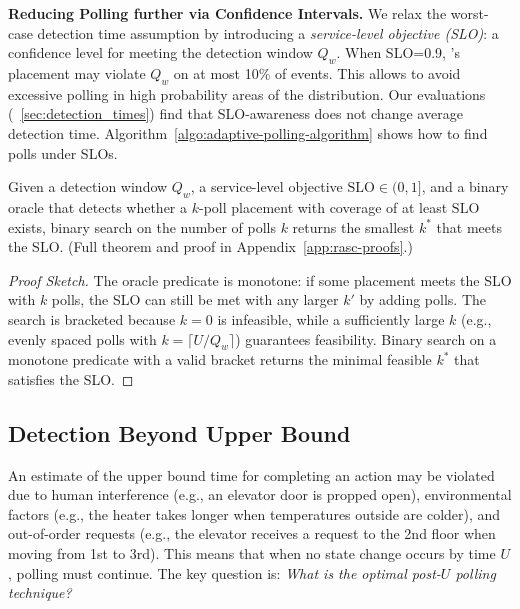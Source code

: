 {{\noindent \textbf{Reducing Polling further via  Confidence Intervals.} 
We relax the worst-case detection time assumption by introducing a {\it service-level objective (SLO)}: a confidence level for meeting the detection window $Q_w$. 
When SLO=0.9, \sysname’s placement may violate $Q_w$ on at most 10\% of events.
This allows \sysname{} to avoid excessive polling in high probability areas of the distribution.
Our evaluations (\Section~\ref{sec:detection_times}) find that  SLO-awareness does not change average detection time. Algorithm~\ref{algo:adaptive-polling-algorithm} shows how to find polls under SLOs.

\begin{theorem}
Given a detection window $Q_w$, a service-level objective $\text{SLO}\in(0,1]$, and a binary oracle that detects whether a $k$-poll placement with coverage of at least $\text{SLO}$ exists, binary search on the number of polls $k$ returns the smallest $k^*$ that meets the SLO. (\noindent Full theorem and proof in Appendix~\ref{app:rasc-proofs}.)
\end{theorem}
\vspace{-0.3cm}

\begin{proof}[Proof Sketch]
The oracle predicate is monotone: if some placement meets the SLO with $k$ polls, the SLO can still be met with any larger $k'$ by adding polls. The search is bracketed because $k=0$ is infeasible, while a sufficiently large $k$ (e.g., evenly spaced polls with $k=\lceil U/Q_w\rceil$) guarantees feasibility. Binary search on a monotone predicate with a valid bracket returns the minimal feasible $k^*$ %
that satisfies the SLO.
\end{proof}

\subsection{Detection Beyond  Upper Bound}
\label{sec:detect-after-U}

{
An estimate of the upper bound time for completing an action may be violated due to 
human interference (e.g., an elevator door is propped open), environmental factors (e.g., the heater takes longer when temperatures outside are colder), and out-of-order requests (e.g., the elevator receives a request to the 2nd floor when moving from 1st to 3rd). 
This means that
when no state change occurs by time $U$, polling must continue. %
The key question is: {\it 
What is the optimal post-$U$ polling technique?} 

}}}
